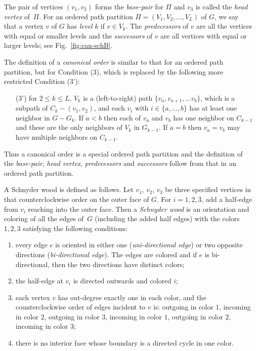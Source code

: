 \documentclass{article}
\newcommand{\df}{\textit}
\begin{document}
The pair of vertices $(v_1, v_2)$ forms the \df{base-pair} for $\Pi$ and $v_3$ is called the \df{head vertex}
of~$\Pi$.
For an ordered path partition $\Pi=(V_1,V_2,\ldots,V_L)$ of $G$, we say that a vertex $v$ of $G$ has
\df{level} $k$ if $v\in V_k$. The \df{predecessors} of $v$ are all the vertices with equal or smaller levels
and the \df{successors} of $v$ are all vertices with equal or larger levels; see Fig.~\ref{fig:can-schB}.



The definition of a \df{canonical order} is similar to that for an ordered path partition, but for Condition (3),
 which is replaced by the following more restricted Condition (3'):

\begin{enumerate}
	\item[(3')] for $2\le k\le L$, $V_k$ is a (left-to-right) path $\{v_a, v_{a+1}, \ldots v_b\}$, which is a
		subpath of $C_{k}-(v_1,v_2)$,
		and each $v_i$ with $i\in\{a,\dots, b\}$ has at least one neighbor in $G-G_k$.
If $a<b$ then each of $v_a$ and $v_b$ has one neighbor on $C_{k-1}$ and these are the only
		neighbors of $V_k$ in $G_{k-1}$.
		If $a=b$ then $v_a=v_b$ may have multiple neighbors on $C_{k-1}$.
\end{enumerate}


Thus a canonical order is a special ordered path partition and the definition of the \df{base-pair},
 \df{head vertex}, \df{predecessors} and \df{successors} follow from that in an ordered path partition.


A Schnyder wood is defined as follows. Let $v_1$, $v_2$, $v_3$ be three specified vertices
in that counterclockwise order on the outer face of $G$. For $i=1,2,3$, add a half-edge from $v_i$
reaching into the outer face. Then a \df{Schnyder wood} is an orientation and coloring of all the edges of~$G$
(including the added half edges) with the colors $1,2,3$ satisfying the following conditions:

\begin{enumerate}[(1)]


	\item every edge $e$ is oriented in either one (\df{uni-directional edge}) or two opposite directions
		(\df{bi-directional edge}). The edges are colored and if $e$ is bi-directional, then the two
		directions have distinct colors;

	\item the half-edge at $v_i$ is directed outwards and colored $i$;

	\item each vertex $v$ has out-degree exactly one in each color, and the counterclockwise
		order of edges incident to $v$ is: outgoing in color $1$, incoming in color $2$, outgoing
		in color $3$, incoming in color $1$, outgoing in color $2$, incoming in color $3$;

	\item there is no interior face whose boundary is a directed cycle in one color.

\end{enumerate}
\end{document}

